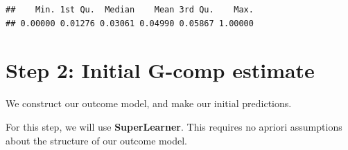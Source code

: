 \documentclass[
]{book}
\newenvironment{Shaded}{\begin{snugshade}}{\end{snugshade}}
\newcommand{\AttributeTok}[1]{\textcolor[rgb]{0.77,0.63,0.00}{#1}}
\newcommand{\DecValTok}[1]{\textcolor[rgb]{0.00,0.00,0.81}{#1}}
\newcommand{\FunctionTok}[1]{\textcolor[rgb]{0.00,0.00,0.00}{#1}}
\newcommand{\NormalTok}[1]{#1}
\newcommand{\OtherTok}[1]{\textcolor[rgb]{0.56,0.35,0.01}{#1}}
\newcommand{\SpecialCharTok}[1]{\textcolor[rgb]{0.00,0.00,0.00}{#1}}
\newcommand{\StringTok}[1]{\textcolor[rgb]{0.31,0.60,0.02}{#1}}
\begin{document}
\begin{Shaded}
\end{Shaded}

\begin{verbatim}
##    Min. 1st Qu.  Median    Mean 3rd Qu.    Max. 
## 0.00000 0.01276 0.03061 0.04990 0.05867 1.00000
\end{verbatim}

\hypertarget{step-2-initial-g-comp-estimate}{%
\section{Step 2: Initial G-comp estimate}\label{step-2-initial-g-comp-estimate}}

\begin{rmdcomment}
We construct our outcome model, and make our initial predictions.
\end{rmdcomment}

For this step, we will use \textbf{SuperLearner}. This requires no apriori assumptions about the structure of our outcome model.

\begin{Shaded}
\end{Shaded}
\end{document}
